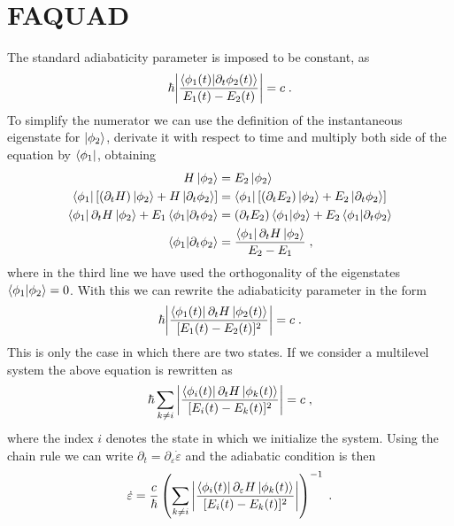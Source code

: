 \documentclass[a4paper,11pt]{article}
\begin{document}
\newpage
\section{FAQUAD}
The standard adiabaticity parameter is imposed to be constant, as
\begin{equation}
	\hbar\abs{\frac{\braket{\phi_1(t)}{\partial_t\phi_2(t)}}{E_1(t)-E_2(t)}}=c\; .
	\label{eq:adiabatic_parameter}
\end{equation}
To simplify the numerator we can use the definition of the instantaneous eigenstate for $\ket{\phi_2}$, derivate it with respect to time and multiply both side of the equation by $\bra{\phi_1}$, obtaining
\begin{equation}
	\begin{split}
	H\ket{\phi_2}&=E_2\ket{\phi_2}\\
	\bra{\phi_1}[(\partial_t H)\ket{\phi_2}+H\ket{\partial_t\phi_2}]&=\bra{\phi_1}[(\partial_t E_2)\ket{\phi_2}+E_2\ket{\partial_t\phi_2}]\\
	\bra{\phi_1}\partial_t H\ket{\phi_2}+E_1\braket{\phi_1}{\partial_t\phi_2}&=(\partial_t E_2)\braket{\phi_1}{\phi_2}+E_2\braket{\phi_1}{\partial_t\phi_2}\\
	\braket{\phi_1}{\partial_t\phi_2}&=\frac{\bra{\phi_1}\partial_t H\ket{\phi_2}}{E_2-E_1}\; ,
	\end{split}
\end{equation}
where in the third line we have used the orthogonality of the eigenstates $\braket{\phi_1}{\phi_2}=0$. With this we can rewrite the adiabaticity parameter in the form
\begin{equation}
\hbar\abs{\frac{\bra{\phi_1(t)}\partial_t H\ket{\phi_2(t)}}{[E_1(t)-E_2(t)]^2}}=c\; .
\end{equation}
This is only the case in which there are two states. If we consider a multilevel system the above equation is rewritten as
\begin{equation}
	\hbar \sum _{k\neq i}\abs{\frac{\bra{\phi_i(t)}\partial_t H\ket{\phi_k(t)}}{[E_i(t)-E_k(t)]^2}}=c\; ,
\end{equation}
where the index $i$ denotes the state in which we initialize the system. Using the chain rule we can write $\partial_t=\partial_\varepsilon \dot{\varepsilon}$ and the adiabatic condition is then
\begin{equation}
	\dot{\varepsilon}=\frac{c}{\hbar}\left(\sum _{k\neq i}\abs{\frac{\bra{\phi_i(t)}\partial_\varepsilon H\ket{\phi_k(t)}}{[E_i(t)-E_k(t)]^2}}\right)^{-1}\; .
	\label{eq:detuning_EDO}
\end{equation}
\end{document}
